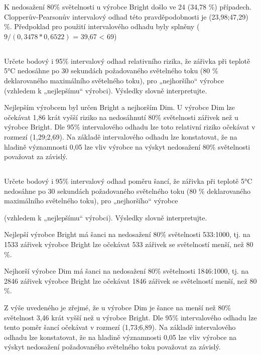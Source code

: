 \documentclass[czech]{article}%
\begin{document}
K nedosažení 80\% světelnosti u výrobce Bright došlo ve 24 (34,78 \%) případech.
Clopperův-Pearsonův intervalový odhad této pravděpodobnosti je (23,98;47,29) \%.
Předpoklad pro použití intervalového odhadu byly splněny ($9/(0,3478*0,6522)$ = 39,67 \textless{} 69)


\newpage
\subsection{}
Určete bodový i 95\% intervalový odhad relativního rizika, 
že zářivka při teplotě 5°C nedosáhne po 30 sekundách požadovaného světelného toku 
(80 \% deklarovaného maximálního světelného toku), pro „nejhoršího“ 
výrobce (vzhledem k „nejlepšímu“ výrobci). Výsledky slovně interpretujte.

Nejlepším výrobcem byl určen Bright a nejhorším Dim.
U výrobce Dim lze očekávat 1,86 krát vyšší riziko na nedosáhnutí 
80\% světelnosti zářivek než u výrobce Bright.
Dle 95\% intervalového odhadu lze toto relativní riziko očekávat v rozmezí (1,29;2,69).
Na základě intervalového odhadu lze konstatovat, že na hladině významnosti 0,05 lze 
vliv výrobce na výskyt nedosažení 80\% světelnosti považovat za závislý.


\newpage
\subsection{}
Určete bodový i 95\% intervalový odhad poměru šancí, 
že zářivka při teplotě 5°C nedosáhne po 30 sekundách požadovaného světelného toku 
(80 \% deklarovaného maximálního světelného toku), pro „nejhoršího“ výrobce 

(vzhledem k „nejlepšímu“ výrobci). Výsledky slovně interpretujte.

Nejlepší výrobce Bright má šanci na nedosažení 80\% světelnosti 533:1000, 
tj. na 1533 zářivek výrobce Bright lze očekávat 533 zářivek se světelností menší, než 80 \%.

Nejhorší výrobce Dim má šanci na nedosažení 80\% světelnosti 1846:1000, 
tj. na 2846 zářivek výrobce Bright lze očekávat 1846 zářivek se světelností menší, než 80 \%.

Z výše uvedeného je zřejmé, že u výrobce Dim je šance na menší než 80\% světelnost 3,46 krát vyšší
než u výrobce Bright. Dle 95\% intervalového odhadu lze tento poměr šancí očekávat v rozmezí
(1,73;6,89). Na základě intervalového odhadu lze konstatovat, že na hladině významnosti 0,05 lze
vliv výrobce na výskyt nedosažení požadovaného světelného toku považovat za závislý.
\end{document}
